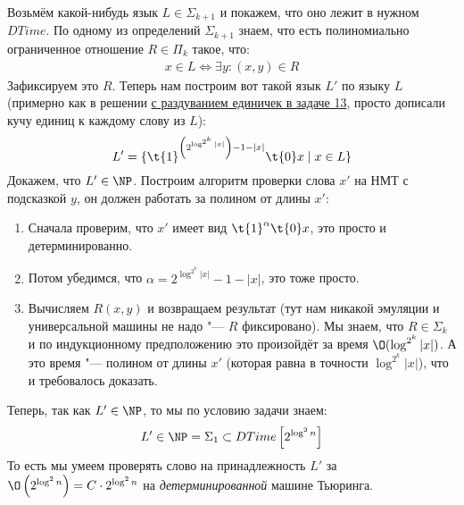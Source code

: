 	Возьмём какой-нибудь язык $L \in \Sigma_{k+1}$ и покажем, что оно лежит в нужном $DTime$.
	По одному из определений $\Sigma_{k+1}$ знаем, что есть полиномиально ограниченное отношение
	$R \in \Pi_k$ такое, что:
	\begin{gather*}
		x \in L \iff \exists y \colon (x, y) \in R
	\end{gather*}
	Зафиксируем это $R$.
	Теперь нам построим вот такой язык $L'$ по языку $L$ (примерно как в решении
	\hyperref[prob13_sol2]{с раздуванием единичек в задаче 13}, просто дописали кучу единиц к
	каждому слову из $L$):
	\[
		L' = \{
			\t{1}^{\left(2^{\log^{2^k} |x|}\right) - 1 - |x|}
			\t{0}
			x
			\mid
			x \in L
		\}
	\]
	Докажем, что $L' \in \NP$.
	Построим алгоритм проверки слова $x'$ на НМТ с подсказкой $y$, он должен работать за полином
	от длины $x'$:
	\begin{enumerate}
		\item Сначала проверим, что $x'$ имеет вид $\t{1}^\alpha \t{0}x$, это просто и детерминированно.
		\item Потом убедимся, что $\alpha = 2^{\log^{2^k} |x|} - 1 - |x|$, это тоже просто.
		\item
			Вычисляем $R(x, y)$ и возвращаем результат (тут нам никакой эмуляции и универсальной машины не надо "--- $R$ фиксировано).
			Мы знаем, что $R \in \Sigma_k$ и по индукционному предположению это произойдёт за время $\O(\log^{2^k} |x|)$.
			А это время "--- полином от длины $x'$ (которая равна в точности $\log^{2^k} |x|$), что и требовалось доказать.
	\end{enumerate}
	Теперь, так как $L' \in \NP$, то мы по условию задачи знаем:
	\[ L' \in \NP = \Sigma_1 \subset DTime\left[2^{\log^2 n}\right] \]
	То есть мы умеем проверять слово на принадлежность $L'$ за $\O\left(2^{\log^2n}\right)=C\cdot 2^{\log^2n}$ на \textit{детерминированной} машине Тьюринга.

